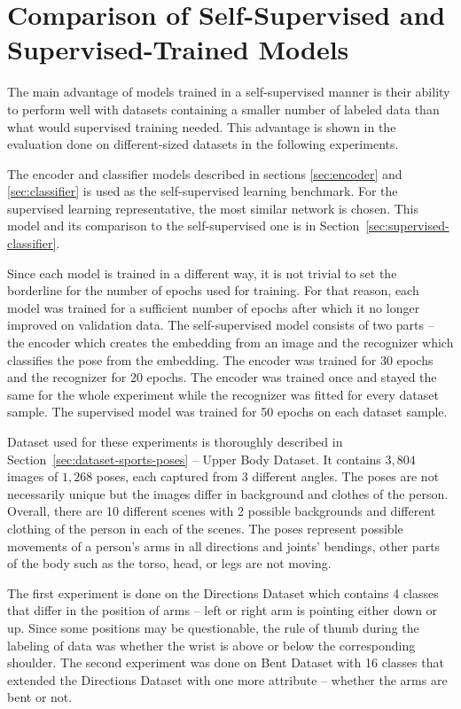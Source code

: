 \section{\label{sec:evaluation-comparison}Comparison of Self-Supervised and Supervised-Trained Models}

The main advantage of models trained in a self-supervised manner is their ability to perform well with datasets containing a smaller number of labeled data than what would supervised training needed. This advantage is shown in the evaluation done on different-sized datasets in the following experiments.

The encoder and classifier models described in sections \ref{sec:encoder} and \ref{sec:classifier} is used as the self-supervised learning benchmark. For the supervised learning representative, the most similar network is chosen. This model and its comparison to the self-supervised one is in Section~\ref{sec:supervised-classifier}.

Since each model is trained in a different way, it is not trivial to set the borderline for the number of epochs used for training. For that reason, each model was trained for a sufficient number of epochs after which it no longer improved on validation data. The self-supervised model consists of two parts -- the encoder which creates the embedding from an image and the recognizer which classifies the pose from the embedding. The encoder was trained for 30 epochs and the recognizer for 20 epochs. The encoder was trained once and stayed the same for the whole experiment while the recognizer was fitted for every dataset sample. The supervised model was trained for 50 epochs on each dataset sample.

Dataset used for these experiments is thoroughly described in Section~\ref{sec:dataset-sports-poses} -- Upper Body Dataset. It contains $3{,}804$ images of $1{,}268$ poses, each captured from 3 different angles. The poses are not necessarily unique but the images differ in background and clothes of the person. Overall, there are 10 different scenes with 2 possible backgrounds and different clothing of the person in each of the scenes. The poses represent possible movements of a person's arms in all directions and joints' bendings, other parts of the body such as the torso, head, or legs are not moving.

The first experiment is done on the Directions Dataset which contains 4 classes that differ in the position of arms -- left or right arm is pointing either down or up. Since some positions may be questionable, the rule of thumb during the labeling of data was whether the wrist is above or below the corresponding shoulder. The second experiment was done on Bent Dataset with 16 classes that extended the Directions Dataset with one more attribute -- whether the arms are bent or not.

